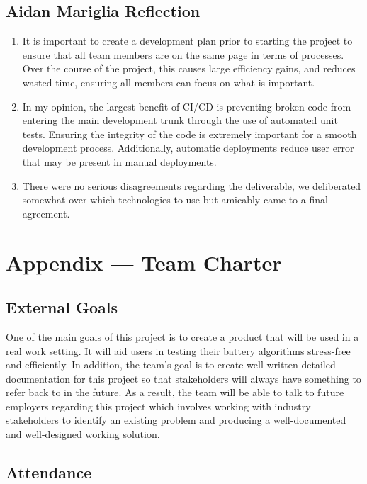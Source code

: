 \documentclass{article}
\begin{document}
\subsection*{Aidan Mariglia Reflection}
\begin{enumerate}
    \item It is important to create a development plan prior to starting the project to ensure that all team members are on the same page in terms of processes. Over the course of the project, this causes large efficiency gains, and reduces wasted time, ensuring all members can focus on what is important.
    \item In my opinion, the largest benefit of CI/CD is preventing broken code from entering the main development trunk through the use of automated unit tests. Ensuring the integrity of the code is extremely important for a smooth development process. Additionally, automatic deployments reduce user error that may be present in manual deployments.
    \item There were no serious disagreements regarding the deliverable, we deliberated somewhat over which technologies to use but amicably came to a final agreement.
\end{enumerate}


\newpage{}

\section*{Appendix --- Team Charter}

\subsection*{External Goals}

One of the main goals of this project is to create a product that will be used in a real work setting. It will aid users in testing their battery algorithms stress-free and efficiently. In addition, the team’s goal is to create well-written detailed documentation for this project so that stakeholders will always have something to refer back to in the future. As a result, the team will be able to talk to future employers regarding this project which involves working with industry stakeholders to identify an existing problem and producing a well-documented and well-designed working solution.

\subsection*{Attendance}
\end{document}
